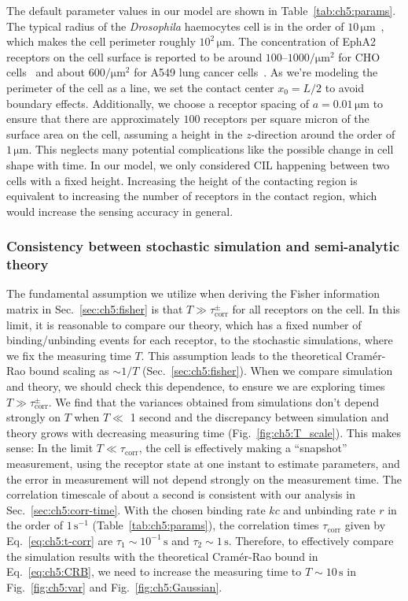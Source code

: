 The default parameter values in our model are shown in Table~\ref{tab:ch5:params}.
The typical radius of the \emph{Drosophila} haemocytes cell is in the order of $10\,\mathrm{\mu m}$~\cite{davis2012emergence}, which makes the cell perimeter roughly $10^2\,\mathrm{\mu m}$.
The concentration of EphA2 receptors on the cell surface is reported to be around $100\textrm{--}1000/\mathrm{\mu m}^2$ for CHO cells~\cite{wirth2022direct} and about $600/\mathrm{\mu m}^2$ for A549 lung cancer cells~\cite{singh2018epha2}.
As we're modeling the perimeter of the cell as a line, we set the contact center $x_0=L/2$ to avoid boundary effects.
Additionally, we choose a receptor spacing of $a=0.01\,\mathrm{\mu m}$ to ensure that there are approximately $100$ receptors per square micron of the surface area on the cell, assuming a height in the $z$-direction around the order of $1\,\mathrm{\mu m}$.
This neglects many potential complications like the possible change in cell shape with time.
In our model, we only considered CIL happening between two cells with a fixed height.
Increasing the height of the contacting region is equivalent to increasing the number of receptors in the contact region, which would increase the sensing accuracy in general.

\subsubsection{Consistency between stochastic simulation and semi-analytic theory}

The fundamental assumption we utilize when deriving the Fisher information matrix in Sec.~\ref{sec:ch5:fisher} is that $T\gg\tau_\textrm{corr}^\pm$ for all receptors on the cell.
In this limit, it is reasonable to compare our theory, which has a fixed number of binding/unbinding events for each receptor, to the stochastic simulations, where we fix the measuring time $T$.
This assumption leads to the theoretical Cram\'{e}r-Rao bound scaling as $\sim 1/T$ (Sec.~\ref{sec:ch5:fisher}).
When we compare simulation and theory, we should check this dependence, to ensure we are exploring times $T\gg\tau_\textrm{corr}^\pm$.
We find that the variances obtained from simulations don't depend strongly on $T$ when $T\ll$ 1 second and the discrepancy between simulation and theory grows with decreasing measuring time (Fig.~\ref{fig:ch5:T_scale}).
This makes sense: In the limit $T \ll \tau_\textrm{corr}$, the cell is effectively making a ``snapshot'' measurement, using the receptor state at one instant to estimate parameters, and the error in measurement will not depend strongly on the measurement time.
The correlation timescale of about a second is consistent with our analysis in Sec.~\ref{sec:ch5:corr-time}.
With the chosen binding rate $kc$ and unbinding rate $r$ in the order of $1\,\mathrm{s^{-1}}$ (Table~\ref{tab:ch5:params}), the correlation times $\tau_\textrm{corr}$ given by Eq.~\eqref{eq:ch5:t-corr} are $\tau_1\sim10^{-1}\,\mathrm{s}$ and $\tau_2\sim1\,\mathrm{s}$.
Therefore, to effectively compare the simulation results with the theoretical Cram\'{e}r-Rao bound in Eq.~\eqref{eq:ch5:CRB}, we need to increase the measuring time to $T\sim10\,\mathrm{s}$ in Fig.~\ref{fig:ch5:var} and Fig.~\ref{fig:ch5:Gaussian}.


